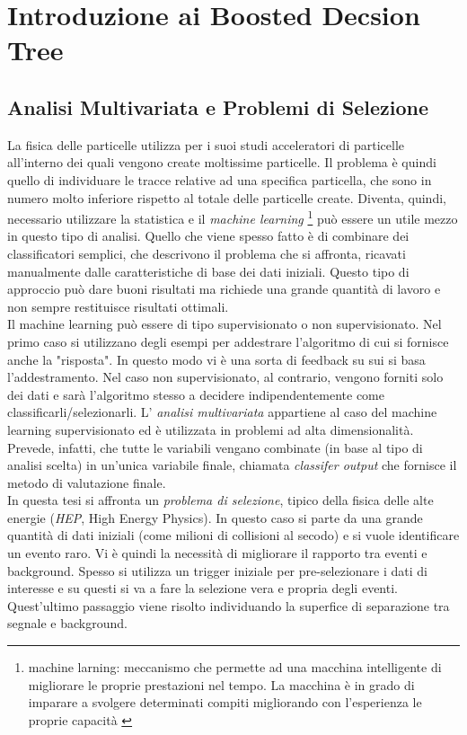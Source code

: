\chapter{Introduzione ai Boosted Decsion Tree}

\section{Analisi Multivariata e Problemi di Selezione}
La fisica delle particelle utilizza per i suoi studi acceleratori di particelle all'interno dei quali vengono create moltissime particelle. Il problema è quindi quello di individuare le tracce relative ad una specifica particella, che sono in numero molto inferiore rispetto al totale delle particelle create. Diventa, quindi, necessario utilizzare la statistica e il \textit{machine learning} \footnote{machine larning: meccanismo che permette ad una macchina intelligente di migliorare le proprie prestazioni nel tempo. La macchina è in grado di imparare a svolgere determinati compiti migliorando con l'esperienza le proprie capacità \cite{sitoMachineLearning}} può essere un utile mezzo in questo tipo di analisi. Quello che viene spesso fatto è di combinare dei classificatori semplici, che descrivono il problema che si affronta, ricavati manualmente dalle caratteristiche di base dei dati iniziali. Questo tipo di approccio può dare buoni risultati ma richiede una grande quantità di lavoro e non sempre restituisce risultati ottimali.\cite{articoloDeepLearning} 
\\Il machine learning può essere di tipo supervisionato o non supervisionato. Nel primo caso si utilizzano degli esempi per addestrare l'algoritmo di cui si fornisce anche la "risposta". In questo modo vi è una sorta di feedback su sui si basa l'addestramento. Nel caso non supervisionato, al contrario, vengono forniti solo dei dati e sarà l'algoritmo stesso a decidere indipendentemente come classificarli/selezionarli. L' \textit{analisi multivariata}  appartiene al caso del machine learning supervisionato ed è utilizzata in problemi ad alta dimensionalità. Prevede, infatti, che tutte le variabili vengano combinate (in base al tipo di analisi scelta) in un'unica variabile finale, chiamata \textit{classifer output} che fornisce il metodo di valutazione finale.
\\In questa tesi si affronta un \textit{problema di selezione}, tipico della fisica delle alte energie (\textit{HEP}, High Energy Physics). In questo caso si parte da una grande quantità di dati iniziali (come milioni di collisioni al secodo) e si vuole identificare un evento raro. Vi è quindi la necessità di migliorare il rapporto tra eventi e background. Spesso si utilizza un trigger iniziale per pre-selezionare i dati di interesse e su questi si va a fare la selezione vera e propria degli eventi. Quest'ultimo passaggio viene risolto individuando la superfice di separazione tra segnale e background. 


